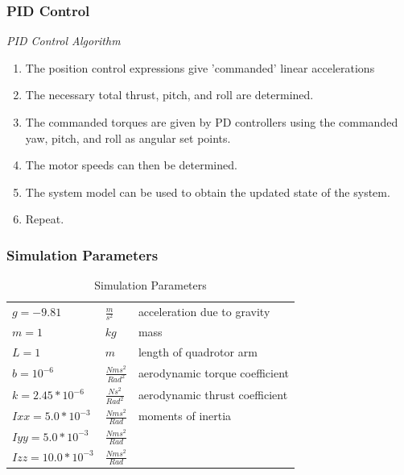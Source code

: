 \documentclass{beamer}
\begin{document}
\begin{frame}
\frametitle{PID Control}

\textit{PID Control Algorithm}

\begin{enumerate}
\item The position control expressions give 'commanded' linear accelerations
\item The necessary total thrust, pitch, and roll are determined.
\item The commanded torques are given by PD controllers using the commanded yaw, pitch, and roll as angular set points.
\item The motor speeds can then be determined.
\item The system model can be used to obtain the updated state of the system.
\item Repeat.
\end{enumerate}

\end{frame}



\begin{frame}
\frametitle{Simulation Parameters}

\begin{table}
\centering
\begin{tabular}{l l l}
    \hline
    $g = -9.81            $& $ \frac{m}{s^2}          $ & acceleration due to gravity\\
    $m = 1                $& $ kg                      $ & mass\\ 
    $L = 1                $& $ m                       $ & length of quadrotor arm\\
    $b = 10^{-6}          $& $ \frac{N m s^2}{Rad^2}  $ & aerodynamic torque coefficient\\
    $k = 2.45*10^{-6}     $& $ \frac{N s^2}{Rad^2}    $ & aerodynamic thrust coefficient\\
    $Ixx = 5.0*10^{-3}    $& $ \frac{N m s^2}{Rad}    $ & moments of inertia \\
    $Iyy = 5.0*10^{-3}    $& $ \frac{N m s^2}{Rad}    $ & \\
    $Izz = 10.0*10^{-3}   $& $ \frac{N m s^2}{Rad}    $ & \\
    \hline
\end{tabular}
\caption[Simulation Parameters]{Simulation Parameters}
\end{table}

\end{frame}
\end{document}
